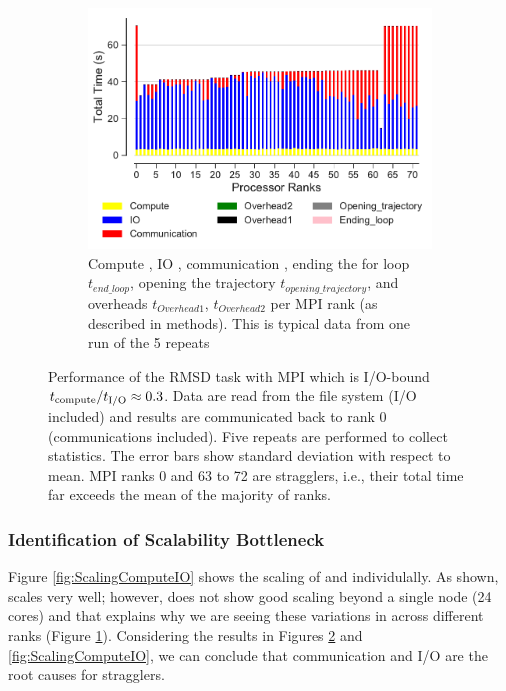 \begin{figure}[ht!]
\begin{subfigure} {.8\textwidth}
  \includegraphics[width=\linewidth]{figures/main-RMSD-BarPlot-rank-comparison_72_4.pdf}
  \caption{Compute \tcomp, IO \tIO, communication \tcomm, ending the for loop $t_{end\_loop}$,
  opening the trajectory $t_{opening\_trajectory}$, and overheads $t_{Overhead1}$,  $t_{Overhead2}$ per MPI rank (as described in methods).
  This is typical data from one run of the 5 repeats}
  \label{fig:MPIranks}
\end{subfigure}
%
\caption{Performance of the RMSD task with MPI which is I/O-bound ${t}_{\text{compute}}/{t}_{\text{I/O}} \approx 0.3$.
Data are read from the file system (I/O included) and results are communicated back to
rank 0 (communications included). Five repeats are performed to collect statistics. The error bars show
standard deviation with respect to mean. MPI ranks 0 and 63 to 72 are stragglers, i.e., their total time 
far exceeds the mean of the majority of ranks.}
  
\label{fig:MPIwithIO}
\end{figure} 

\subsubsection*{Identification of Scalability Bottleneck}

Figure \ref{fig:ScalingComputeIO} shows the scaling of \tcomp and \tIO individulally. 
As shown, \tcomp scales very well; however, \tIO does not show good scaling beyond a single node (24 cores) and that explains why we are seeing these variations in \tIO across different ranks (Figure \ref{fig:MPIranks}). 
Considering the results in Figures \ref{fig:MPIwithIO} and \ref{fig:ScalingComputeIO}, we can conclude that communication and I/O are the root causes for stragglers. 

